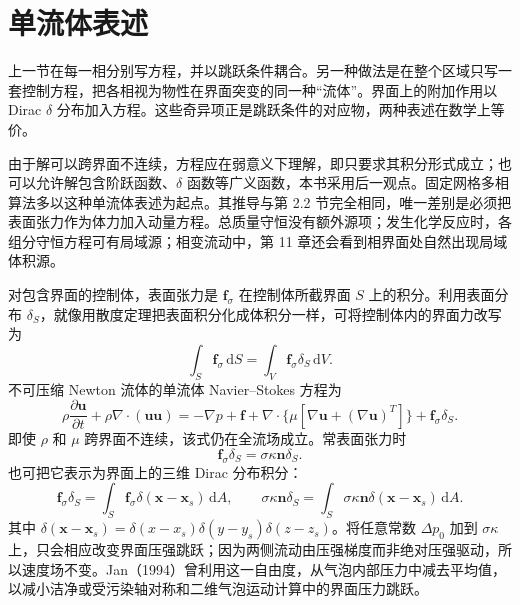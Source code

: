 \documentclass[11pt,a4paper,openany,fontset=none]{ctexbook}
\begin{document}
\section{单流体表述}


上一节在每一相分别写方程，并以跳跃条件耦合。另一种做法是在整个区域只写一套控制方程，把各相视为物性在界面突变的同一种“流体”。界面上的附加作用以 Dirac $\delta$ 分布加入方程。这些奇异项正是跳跃条件的对应物，两种表述在数学上等价。

由于解可以跨界面不连续，方程应在弱意义下理解，即只要求其积分形式成立；也可以允许解包含阶跃函数、$\delta$ 函数等广义函数，本书采用后一观点。固定网格多相算法多以这种单流体表述为起点。其推导与第 2.2 节完全相同，唯一差别是必须把表面张力作为体力加入动量方程。总质量守恒没有额外源项；发生化学反应时，各组分守恒方程可有局域源；相变流动中，第 11 章还会看到相界面处自然出现局域体积源。

对包含界面的控制体，表面张力是 $\bm f_\sigma$ 在控制体所截界面 $S$ 上的积分。利用表面分布 $\delta_S$，就像用散度定理把表面积分化成体积分一样，可将控制体内的界面力改写为
\begin{equation}
 \int_S\bm f_\sigma\,\mathrm dS=\int_V\bm f_\sigma\delta_S\,\mathrm dV. \tag{2.60}
\end{equation}
不可压缩 Newton 流体的单流体 Navier--Stokes 方程为
\begin{equation}
 \rho\frac{\partial\bm u}{\partial t}+\rho\nabla\cdot(\bm u\bm u)
 =-\nabla p+\bm f+\nabla\cdot\{\mu[\nabla\bm u+(\nabla\bm u)^T]\}
 +\bm f_\sigma\delta_S. \tag{2.61}
\end{equation}
即使 $\rho$ 和 $\mu$ 跨界面不连续，该式仍在全流场成立。常表面张力时
\begin{equation}
 \bm f_\sigma\delta_S=\sigma\kappa\bm n\delta_S. \tag{2.62}
\end{equation}
也可把它表示为界面上的三维 Dirac 分布积分：
\begin{equation}
\bm f_\sigma\delta_S=\int_S\bm f_\sigma\delta(\bm x-\bm x_s)\,\mathrm dA,
\qquad
\sigma\kappa\bm n\delta_S=\int_S\sigma\kappa\bm n\delta(\bm x-\bm x_s)\,\mathrm dA. \tag{2.63}
\end{equation}
其中 $\delta(\bm x-\bm x_s)=\delta(x-x_s)\delta(y-y_s)\delta(z-z_s)$。将任意常数 $\Delta p_0$ 加到 $\sigma\kappa$ 上，只会相应改变界面压强跳跃；因为两侧流动由压强梯度而非绝对压强驱动，所以速度场不变。Jan（1994）曾利用这一自由度，从气泡内部压力中减去平均值，以减小洁净或受污染轴对称和二维气泡运动计算中的界面压力跳跃。
\end{document}
